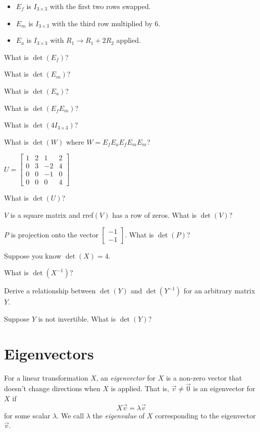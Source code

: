 \documentclass[14pt]{problemset}
\newcommand{\mat}[1]{\begin{bmatrix}#1\end{bmatrix}}
\begin{document}
	\question
	\begin{itemize}
		\item $E_f$ is $I_{3\times 3}$ with the first two rows swapped.
		\item $E_m$ is $I_{3\times 3}$ with the third row multiplied by 6.
		\item $E_a$ is $I_{3\times 3}$ with $R_1\to R_1+2R_2$ applied.
	\end{itemize}

	\begin{parts}
		\item What is $\det(E_f)$?
		\item What is $\det(E_m)$?
		\item What is $\det(E_a)$?
		\item What is $\det(E_fE_m)$?
		\item What is $\det(4I_{3\times 3})$?
		\item What is $\det(W)$ where $W=E_fE_aE_fE_mE_m$?
	\end{parts}

	\question
	$U=\mat{1&2&1&2\\0&3&-2&4\\0&0&-1&0\\0&0&0&4}$
	\begin{parts}
		\item What is $\det(U)$?
		\item $V$ is a square matrix and rref$(V)$ has a row of zeros.
		 What is $\det(V)$?
		\item $P$ is projection onto the vector $\mat{-1\\-1}$. What is $\det(P)$?
	\end{parts}

	\newpage
	\question
	Suppose you know $\det(X)=4$.
	\begin{parts}
		\item What is $\det(X^{-1})$?
		\item Derive a relationship between $\det(Y)$
			and $\det(Y^{-1})$ for an arbitrary matrix $Y$.
		\item Suppose $Y$ is not invertible.  What is $\det(Y)$?
	\end{parts}

\section*{Eigenvectors}

	\vspace{-.6cm}
	\begin{definition}[Eigenvector]
	For a linear transformation $X$, an \emph{eigenvector} for $X$ is a non-zero vector that doesn't
	change directions when $X$ is applied.  That is, $\vec v\neq \vec 0$ is an eigenvector for $X$ if
	\[
		X\vec v=\lambda \vec v
	\]
	for some scalar $\lambda$.  We call $\lambda$ the \emph{eigenvalue} 
	of $X$ corresponding
	to the eigenvector $\vec v$.
	\end{definition}
	\vspace{-.2cm}
\end{document}
